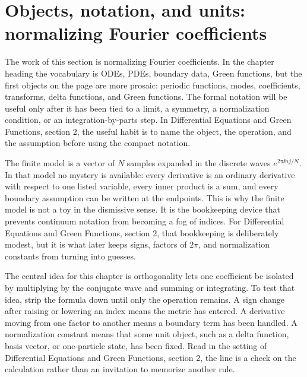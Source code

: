 \section{Objects, notation, and units: normalizing Fourier coefficients}













The work of this section is normalizing Fourier coefficients.  In the chapter heading the vocabulary is ODEs, PDEs, boundary data, Green functions, but the first objects on the page are more prosaic: periodic functions, modes, coefficients, transforms, delta functions, and Green functions.  The formal notation will be useful only after it has been tied to a limit, a symmetry, a normalization condition, or an integration-by-parts step.  In Differential Equations and Green Functions, section 2, the useful habit is to name the object, the operation, and the assumption before using the compact notation.

The finite model is a vector of \(N\) samples expanded in the discrete waves \(e^{2\pi \ii nj/N}\).  In that model no mystery is available: every derivative is an ordinary derivative with respect to one listed variable, every inner product is a sum, and every boundary assumption can be written at the endpoints.  This is why the finite model is not a toy in the dismissive sense.  It is the bookkeeping device that prevents continuum notation from becoming a fog of indices.  For Differential Equations and Green Functions, section 2, that bookkeeping is deliberately modest, but it is what later keeps signs, factors of \(2\pi\), and normalization constants from turning into guesses.

The central idea for this chapter is orthogonality lets one coefficient be isolated by multiplying by the conjugate wave and summing or integrating.  To test that idea, strip the formula down until only the operation remains.  A sign change after raising or lowering an index means the metric has entered.  A derivative moving from one factor to another means a boundary term has been handled.  A normalization constant means that some unit object, such as a delta function, basis vector, or one-particle state, has been fixed.  Read in the setting of Differential Equations and Green Functions, section 2, the line is a check on the calculation rather than an invitation to memorize another rule.

